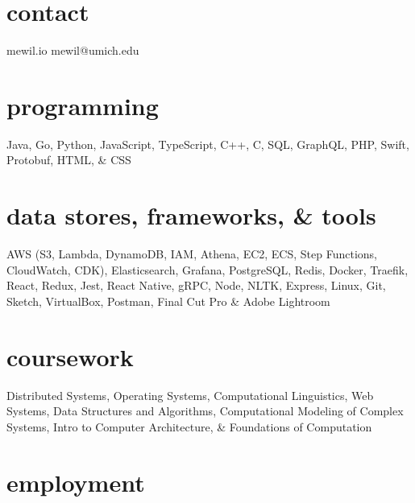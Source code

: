 \documentclass[]{template}
\begin{document}


\begin{aside}
\section{contact}
mewil.io
mewil@umich.edu
\section{programming}
Java, Go, Python, JavaScript, TypeScript, C++, C, SQL, GraphQL, PHP, Swift, Protobuf, HTML, \& CSS
\section{data stores, frameworks, \& tools}
AWS (S3, Lambda, DynamoDB, IAM, Athena, EC2, ECS, Step Functions, CloudWatch, CDK), Elasticsearch, Grafana, PostgreSQL, Redis, Docker, Traefik, React, Redux, Jest, React Native, gRPC, Node, NLTK, Express, Linux, Git, Sketch, VirtualBox, Postman, Final Cut Pro \& Adobe Lightroom
\section{coursework}
Distributed Systems, Operating Systems, Computational Linguistics, Web Systems, Data Structures and Algorithms, Computational Modeling of Complex Systems, Intro to Computer Architecture, \& Foundations of Computation
\end{aside}


\section{employment}
\end{document}
